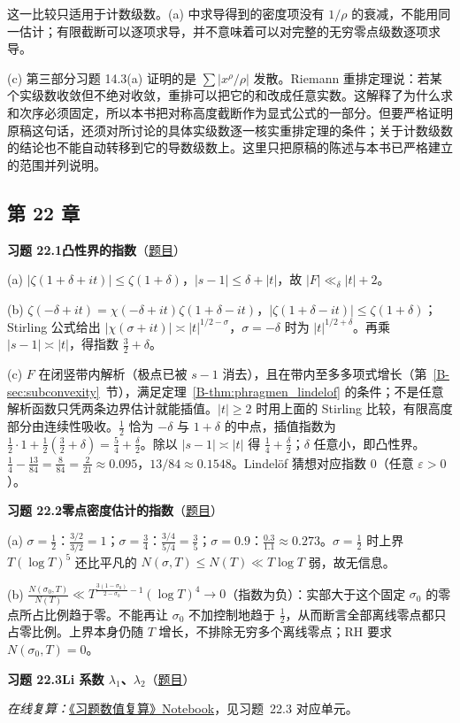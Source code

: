 \documentclass[11pt,a4paper]{article}
\newcommand{\bref}[1]{\ref*{B-#1}}
\newcommand{\Sol}[2]{%
  \par\addvspace{1.2em}\noindent
  \hypertarget{s:#1}{}\textbf{习题 #1\quad #2}\hfill{\small（\hyperlink{q:#1}{题目}）}\par
  \nopagebreak\smallskip}
\begin{document}
这一比较只适用于计数级数。(a) 中求导得到的密度项没有 $1/\rho$ 的衰减，不能用同一估计；有限截断可以逐项求导，并不意味着可以对完整的无穷零点级数逐项求导。

(c) 第三部分习题 14.3(a) 证明的是 $\sum|x^\rho/\rho|$ 发散。Riemann 重排定理说：若某个实级数收敛但不绝对收敛，重排可以把它的和改成任意实数。这解释了为什么求和次序必须固定，所以本书把对称高度截断作为显式公式的一部分。但要严格证明原稿这句话，还须对所讨论的具体实级数逐一核实重排定理的条件；关于计数级数的结论也不能自动转移到它的导数级数上。这里只把原稿的陈述与本书已严格建立的范围并列说明。

\subsection*{第 22 章}

\Sol{22.1}{凸性界的指数}
(a) $|\zeta(1+\delta+it)|\le\zeta(1+\delta)$，$|s-1|\le\delta+|t|$，故 $|F|\ll_\delta|t|+2$。

(b) $\zeta(-\delta+it)=\chi(-\delta+it)\zeta(1+\delta-it)$，$|\zeta(1+\delta-it)|\le\zeta(1+\delta)$；Stirling 公式给出 $|\chi(\sigma+it)|\asymp|t|^{1/2-\sigma}$，$\sigma=-\delta$ 时为 $|t|^{1/2+\delta}$。再乘 $|s-1|\asymp|t|$，得指数 $\frac32+\delta$。

(c) $F$ 在闭竖带内解析（极点已被 $s-1$ 消去），且在带内至多多项式增长（第~\bref{sec:subconvexity}~节），满足定理~\bref{thm:phragmen_lindelof} 的条件；不是任意解析函数只凭两条边界估计就能插值。$|t|\ge2$ 时用上面的 Stirling 比较，有限高度部分由连续性吸收。$\frac12$ 恰为 $-\delta$ 与 $1+\delta$ 的中点，插值指数为 $\frac12\cdot1+\frac12(\frac32+\delta)=\frac54+\frac\delta2$。除以 $|s-1|\asymp|t|$ 得 $\frac14+\frac\delta2$；$\delta$ 任意小，即凸性界。$\frac14-\frac{13}{84}=\frac{8}{84}=\frac2{21}\approx0.095$，$13/84\approx0.1548$。Lindelöf 猜想对应指数 $0$（任意 $\varepsilon>0$）。

\Sol{22.2}{零点密度估计的指数}
(a) $\sigma=\frac12$：$\frac{3/2}{3/2}=1$；$\sigma=\frac34$：$\frac{3/4}{5/4}=\frac35$；$\sigma=0.9$：$\frac{0.3}{1.1}\approx0.273$。$\sigma=\frac12$ 时上界 $T(\log T)^5$ 还比平凡的 $N(\sigma,T)\le N(T)\ll T\log T$ 弱，故无信息。

(b) $\frac{N(\sigma_0,T)}{N(T)}\ll T^{\frac{3(1-\sigma_0)}{2-\sigma_0}-1}(\log T)^4\to0$（指数为负）：实部大于这个固定 $\sigma_0$ 的零点所占比例趋于零。不能再让 $\sigma_0$ 不加控制地趋于 $\frac12$，从而断言全部离线零点都只占零比例。上界本身仍随 $T$ 增长，不排除无穷多个离线零点；RH 要求 $N(\sigma_0,T)=0$。

\Sol{22.3}{Li 系数 $\lambda_1$、$\lambda_2$}
\emph{在线复算：}\href{https://colab.research.google.com/github/lichengtong123/lichengtong-RH/blob/main/\%E4\%B9\%A0\%E9\%A2\%98\%E4\%B8\%8E\%E8\%A7\%A3\%E7\%AD\%94/\%E4\%B9\%A0\%E9\%A2\%98\%E6\%95\%B0\%E5\%80\%BC\%E5\%A4\%8D\%E7\%AE\%97.ipynb}{《习题数值复算》Notebook}，见习题~22.3 对应单元。
\end{document}
